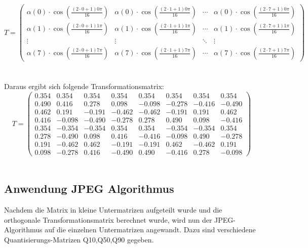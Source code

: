 \documentclass[12pt]{article}
\begin{document}
		
		\[
		T = \left( \begin{array}{cccccccc}
			\alpha(0) \cdot \cos\left(\frac{(2\cdot0+1)0\pi}{16}\right) & \alpha(0) \cdot \cos\left(\frac{(2\cdot1+1)0\pi}{16}\right) & \cdots & \alpha(0) \cdot \cos\left(\frac{(2\cdot7+1)0\pi}{16}\right) \\
			\alpha(1) \cdot \cos\left(\frac{(2\cdot0+1)1\pi}{16}\right) & \alpha(1) \cdot \cos\left(\frac{(2\cdot1+1)1\pi}{16}\right) & \cdots & \alpha(1) \cdot \cos\left(\frac{(2\cdot7+1)1\pi}{16}\right) \\
			\vdots & \vdots & \ddots & \vdots \\
			\alpha(7) \cdot \cos\left(\frac{(2\cdot0+1)7\pi}{16}\right) & \alpha(7) \cdot \cos\left(\frac{(2\cdot1+1)7\pi}{16}\right) & \cdots & \alpha(7) \cdot \cos\left(\frac{(2\cdot7+1)7\pi}{16}\right)
		\end{array} \right)
		\]
		\\\\
		Daraus ergibt sich folgende Transformationsmatrix: \\
	\[
	T = \left( \begin{array}{cccccccc}
			0.354 & 0.354 & 0.354 & 0.354 & 0.354 & 0.354 & 0.354 & 0.354 \\
			0.490 & 0.416 & 0.278 & 0.098 & -0.098 & -0.278 & -0.416 & -0.490 \\
			0.462 & 0.191 & -0.191 & -0.462 & -0.462 & -0.191 & 0.191 & 0.462 \\
			0.416 & -0.098 & -0.490 & -0.278 & 0.278 & 0.490 & 0.098 & -0.416 \\
			0.354 & -0.354 & -0.354 & 0.354 & 0.354 & -0.354 & -0.354 & 0.354 \\
			0.278 & -0.490 & 0.098 & 0.416 & -0.416 & -0.098 & 0.490 & -0.278 \\
			0.191 & -0.462 & 0.462 & -0.191 & -0.191 & 0.462 & -0.462 & 0.191 \\
			0.098 & -0.278 & 0.416 & -0.490 & 0.490 & -0.416 & 0.278 & -0.098
	\end{array} \right)
\]
		\\
		
	
	
	
		\subsection{Anwendung JPEG Algorithmus}
Nachdem die Matrix in kleine Untermatrizen aufgeteilt wurde und die orthogonale Transformationsmatrix berechnet wurde, wird nun der JPEG-Algorithmus auf die einzelnen Untermatrizen angewandt.
Dazu sind verschiedene Quantisierungs-Matrizen Q10,Q50,Q90 gegeben.\\
\end{document}
